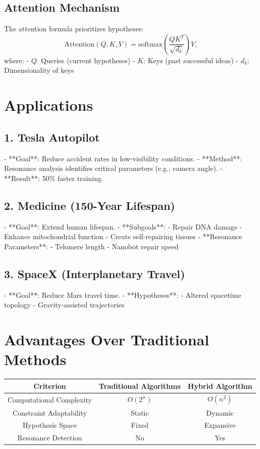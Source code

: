 \documentclass[12pt]{article}
\begin{document}
\subsection{Attention Mechanism}
The attention formula prioritizes hypotheses:
$$
\text{Attention}(Q, K, V) = \text{softmax}\left( \frac{QK^T}{\sqrt{d_k}} \right)V,
$$
where:
- $ Q $: Queries (current hypotheses)
- $ K $: Keys (past successful ideas)
- $ d_k $: Dimensionality of keys

\section{Applications}
\subsection{1. Tesla Autopilot}
- **Goal**: Reduce accident rates in low-visibility conditions.
- **Method**: Resonance analysis identifies critical parameters (e.g., camera angle).
- **Result**: 50\% faster training.

\subsection{2. Medicine (150-Year Lifespan)}
- **Goal**: Extend human lifespan.
- **Subgoals**: 
  - Repair DNA damage
  - Enhance mitochondrial function
  - Create self-repairing tissues
- **Resonance Parameters**: 
  - Telomere length
  - Nanobot repair speed

\subsection{3. SpaceX (Interplanetary Travel)}
- **Goal**: Reduce Mars travel time.
- **Hypotheses**: 
  - Altered spacetime topology
  - Gravity-assisted trajectories

\section{Advantages Over Traditional Methods}
\begin{tabular}{|c|c|c|}
\hline
\textbf{Criterion} & \textbf{Traditional Algorithms} & \textbf{Hybrid Algorithm} \\
\hline
Computational Complexity & $ O(2^n) $ & $ O(n^2) $ \\
\hline
Constraint Adaptability & Static & Dynamic \\
\hline
Hypothesis Space & Fixed & Expansive \\
\hline
Resonance Detection & No & Yes \\
\hline
\end{tabular}
\end{document}
